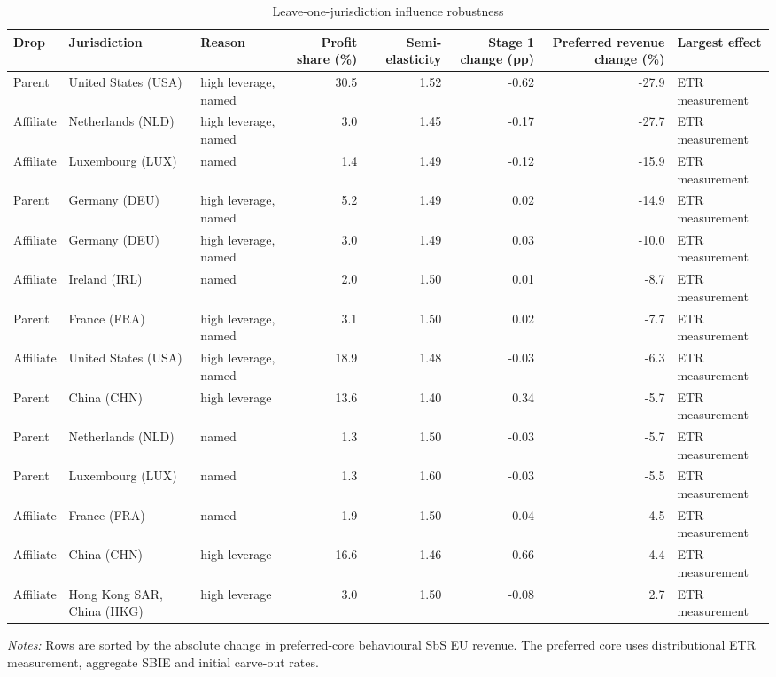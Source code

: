 \begin{table}[H]
\centering
\scriptsize
\caption{Leave-one-jurisdiction influence robustness}
\label{tab:app_jurisdiction_influence_summary}
\begin{adjustbox}{max width=\textwidth,center}
\begin{tabular}{@{}lllrrrrl@{}}
\toprule
Drop & Jurisdiction & Reason & Profit share (\%) & Semi-elasticity & Stage 1 change (pp) & Preferred revenue change (\%) & Largest effect \\
\midrule
Parent & United States (USA) & high leverage, named & 30.5 & 1.52 & -0.62 & -27.9 & ETR measurement \\
Affiliate & Netherlands (NLD) & high leverage, named &  3.0 & 1.45 & -0.17 & -27.7 & ETR measurement \\
Affiliate & Luxembourg (LUX) & named &  1.4 & 1.49 & -0.12 & -15.9 & ETR measurement \\
Parent & Germany (DEU) & high leverage, named &  5.2 & 1.49 &  0.02 & -14.9 & ETR measurement \\
Affiliate & Germany (DEU) & high leverage, named &  3.0 & 1.49 &  0.03 & -10.0 & ETR measurement \\
Affiliate & Ireland (IRL) & named &  2.0 & 1.50 &  0.01 &  -8.7 & ETR measurement \\
Parent & France (FRA) & high leverage, named &  3.1 & 1.50 &  0.02 &  -7.7 & ETR measurement \\
Affiliate & United States (USA) & high leverage, named & 18.9 & 1.48 & -0.03 &  -6.3 & ETR measurement \\
Parent & China (CHN) & high leverage & 13.6 & 1.40 &  0.34 &  -5.7 & ETR measurement \\
Parent & Netherlands (NLD) & named &  1.3 & 1.50 & -0.03 &  -5.7 & ETR measurement \\
Parent & Luxembourg (LUX) & named &  1.3 & 1.60 & -0.03 &  -5.5 & ETR measurement \\
Affiliate & France (FRA) & named &  1.9 & 1.50 &  0.04 &  -4.5 & ETR measurement \\
Affiliate & China (CHN) & high leverage & 16.6 & 1.46 &  0.66 &  -4.4 & ETR measurement \\
Affiliate & Hong Kong SAR, China (HKG) & high leverage &  3.0 & 1.50 & -0.08 &   2.7 & ETR measurement \\
\bottomrule
\end{tabular}
\end{adjustbox}

\vspace{0.5em}
\begin{minipage}{0.96\textwidth}
\footnotesize\raggedright \textit{Notes:} Rows are sorted by the absolute change in preferred-core behavioural SbS EU revenue. The preferred core uses distributional ETR measurement, aggregate SBIE and initial carve-out rates.
\end{minipage}
\end{table}
